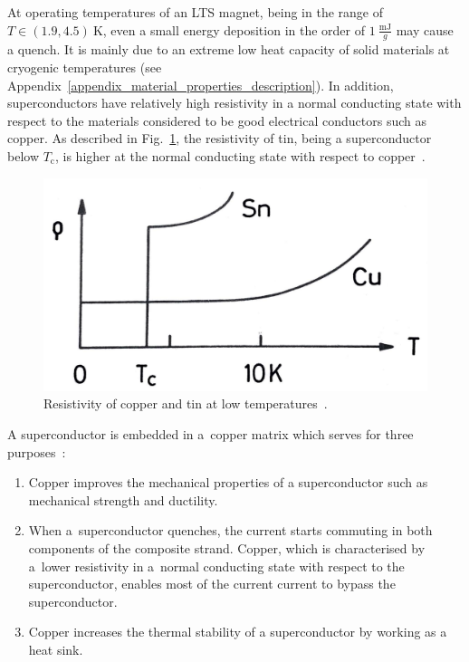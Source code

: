 At operating temperatures of an LTS magnet, being in the range of $T \in (1.9, 4.5)~\text{K}$, even a small energy deposition in the order of $1~\frac{\text{mJ}}{g}$ may cause a quench. It is mainly due to an extreme low heat capacity of solid materials at cryogenic temperatures (see Appendix~\ref{appendix_material_properties_description}). In addition, superconductors have relatively high resistivity in a normal conducting state with respect to the materials considered to be good electrical conductors such as copper. As described in Fig.~\ref{fig:resitivity_tin_copper}, the resistivity of tin, being a superconductor below $T_\text{c}$, is higher at the normal conducting state with respect to copper~\cite[p.~1-6]{superconducting_accelerator_magnets}.

\begin{figure}[H]
    \centering
    \includegraphics[width=0.35\linewidth]{sections/introduction/figures/sn_cu_resistivity.png}
    \caption{Resistivity of copper and tin at low temperatures~\cite{superconducting_accelerator_magnets}.}
    \label{fig:resitivity_tin_copper}
\end{figure} 

A superconductor is embedded in a~copper matrix which serves for three purposes~\cite[p.~31-33]{superconducting_accelerator_magnets}:

\begin{enumerate}
    \item Copper improves the mechanical properties of a superconductor such as mechanical strength and ductility.
    \item When a~superconductor quenches, the current starts commuting in both components of the composite strand. Copper, which is characterised by a~lower resistivity in a~normal conducting state with respect to the superconductor, enables most of the current current to bypass the superconductor.
    \item Copper increases the thermal stability of a superconductor by working as a heat sink. 
\end{enumerate}

